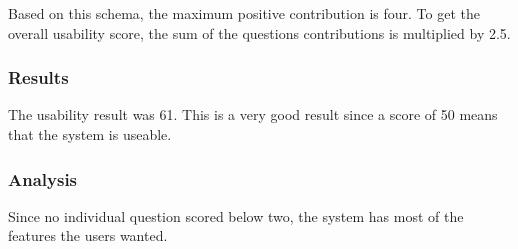 Based on this schema, the maximum positive contribution is four. To get the overall usability score, the sum of the questions contributions is multiplied by 2.5. 

\subsubsection{Results}
The usability result was 61. This is a very good result since a score of 50 means that the system is useable. 

\subsubsection{Analysis}
Since no individual question scored below two, the system has most of the features the users wanted.